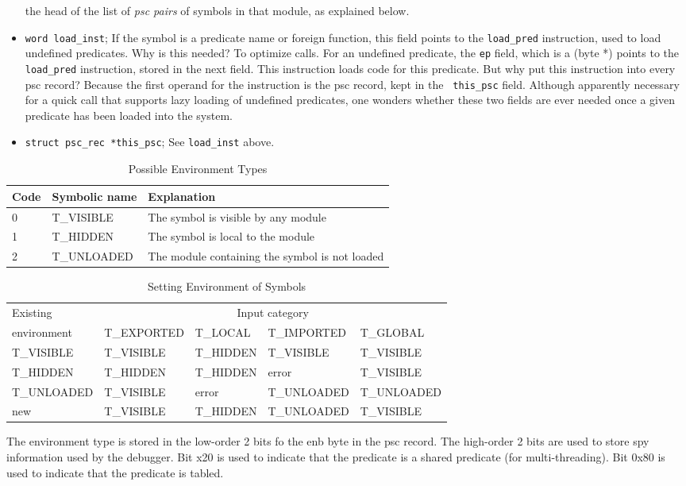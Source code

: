 \documentclass[11pt]{article}
\begin{document}
\begin{itemize}
the head of the list of {\em psc pairs} of symbols in that module, as
explained below.
%
\item {\tt word load\_inst}; If the symbol is a predicate name or
foreign function, this field points to the {\tt load\_pred}
instruction, used to load undefined predicates.  Why is this needed?
To optimize calls.  For an undefined predicate, the {\tt ep} field,
which is a (byte *) points to the {\tt load\_pred} instruction, stored
in the next field.  This instruction loads code for this predicate.
But why put this instruction into every psc record?  Because the first
operand for the instruction is the psc record, kept in the {\tt
this\_psc} field.  Although apparently necessary for a quick call that
supports lazy loading of undefined predicates, one wonders whether
these two fields are ever needed once a given predicate has been
loaded into the system.

\item {\tt struct psc\_rec *this\_psc}; See {\tt load\_inst} above.
\end{itemize}
%
\begin{table}\centering
\begin{tabular}{l|l|l}
\hline
Code	& Symbolic name	& Explanation				\\
\hline
 0	& T\_VISIBLE	& The symbol is visible by any module	\\
 1	& T\_HIDDEN	& The symbol is local to the module 	\\
 2	& T\_UNLOADED	& The module containing the symbol is not loaded \\
\hline
\end{tabular}
\caption{Possible Environment Types}
\label{t:env}
\end{table}
%

\begin{table}\centering
\begin{tabular}{l|llll}
\hline
Existing     & \multicolumn{4}{c}{Input category}	\\ \cline{2-5}
environment  &  T\_EXPORTED &  T\_LOCAL & T\_IMPORTED & T\_GLOBAL \\
\hline
T\_VISIBLE   & T\_VISIBLE & T\_HIDDEN & T\_VISIBLE  & T\_VISIBLE \\
T\_HIDDEN    & T\_HIDDEN  & T\_HIDDEN & error       & T\_VISIBLE \\
T\_UNLOADED  & T\_VISIBLE & error     & T\_UNLOADED & T\_UNLOADED\\
new          & T\_VISIBLE & T\_HIDDEN & T\_UNLOADED & T\_VISIBLE \\
\hline
\end{tabular}
\caption{Setting Environment of Symbols}
\label{t:envset}
\end{table}
%
The environment type is stored in the low-order 2 bits fo the enb byte
in the psc record.  The high-order 2 bits are used to store spy
information used by the debugger.  Bit x20 is used to indicate that
the predicate is a shared predicate (for multi-threading).  Bit 0x80
is used to indicate that the predicate is tabled.
\end{document}
